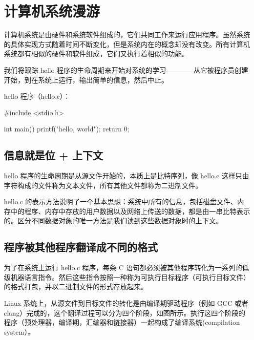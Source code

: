 \chapter{计算机系统漫游}

计算机系统是由硬件和系统软件组成的，它们共同工作来运行应用程序。虽然系统的具体实现方式随着时间不断变化，但是系统内在的概念却没有改变。所有计算机系统都有相似的硬件和软件组成，它们又执行着相似的功能。

我们将跟踪 hello 程序的生命周期来开始对系统的学习————从它被程序员创建开始，到在系统上运行，输出简单的信息，然后中止。

hello 程序（hello.c）：
\begin{cppcode}
#include <stdio.h>

int main() {
    printf("hello, world\n");
    return 0;
}
\end{cppcode}

\section{信息就是位 + 上下文}

hello 程序的生命周期是从源文件开始的，本质上是比特序列，像 hello.c 这样只由字符构成的文件称为文本文件，所有其他文件都称为二进制文件。

hello.c 的表示方法说明了一个基本思想：系统中所有的信息，包括磁盘文件、内存中的程序、内存中存放的用户数据以及网络上传送的数据，都是由一串比特表示的。区分不同数据对象的唯一方法是我们读到这些数据对象时的上下文。

\section{程序被其他程序翻译成不同的格式}

为了在系统上运行 hello.c 程序，每条 C 语句都必须被其他程序转化为一系列的低级机器语言指令。然后这些指令按照一种称为可执行目标程序（可执行目标文件）的格式打包，并以二进制文件的形式存放起来。

Linux 系统上，从源文件到目标文件的转化是由编译期驱动程序（例如 GCC 或者 clang）完成的，这个翻译过程可以分为四个阶段，如图所示。执行这四个阶段的程序（预处理器，编译期，汇编器和链接器）一起构成了编译系统(compilation system）。


